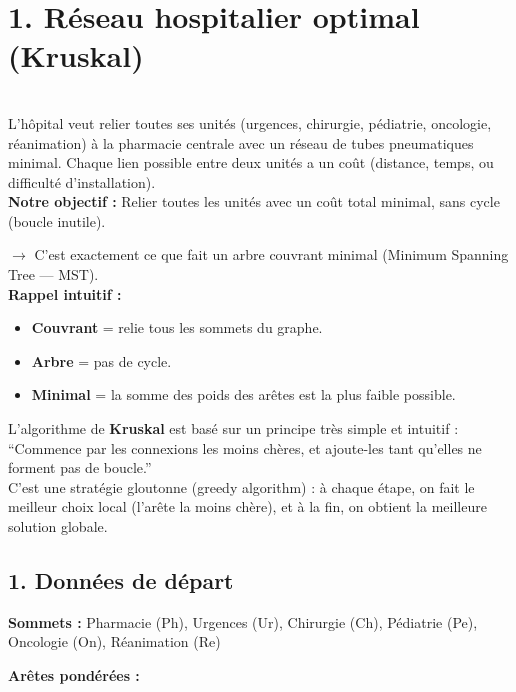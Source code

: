
\section*{1. Réseau hospitalier optimal (Kruskal)}

\text{ } \\
L’hôpital veut relier toutes ses unités (urgences, chirurgie, pédiatrie, oncologie, réanimation) à la pharmacie centrale avec un réseau de tubes pneumatiques minimal.
Chaque lien possible entre deux unités a un coût (distance, temps, ou difficulté d’installation). \\

\textbf{Notre objectif :}
Relier toutes les unités avec un coût total minimal, sans cycle (boucle inutile).

$\rightarrow$ C’est exactement ce que fait un arbre couvrant minimal (Minimum Spanning Tree — MST). \\

\textbf{Rappel intuitif :}
\begin{itemize}
    \item \textbf{Couvrant} = relie tous les sommets du graphe.
    \item \textbf{Arbre} = pas de cycle.
    \item \textbf{Minimal} = la somme des poids des arêtes est la plus faible possible. \\
\end{itemize}

L’algorithme de \textbf{Kruskal} est basé sur un principe très simple et intuitif : “Commence par les connexions les moins chères, et ajoute-les tant qu’elles ne forment pas de boucle.” \\

C’est une stratégie gloutonne (greedy algorithm) : à chaque étape, on fait le meilleur choix local (l’arête la moins chère), et à la fin, on obtient la meilleure solution globale.

\subsection*{1. Données de départ}

\textbf{Sommets :}  
Pharmacie (Ph), Urgences (Ur), Chirurgie (Ch), Pédiatrie (Pe), Oncologie (On), Réanimation (Re)

\medskip

\textbf{Arêtes pondérées :}

